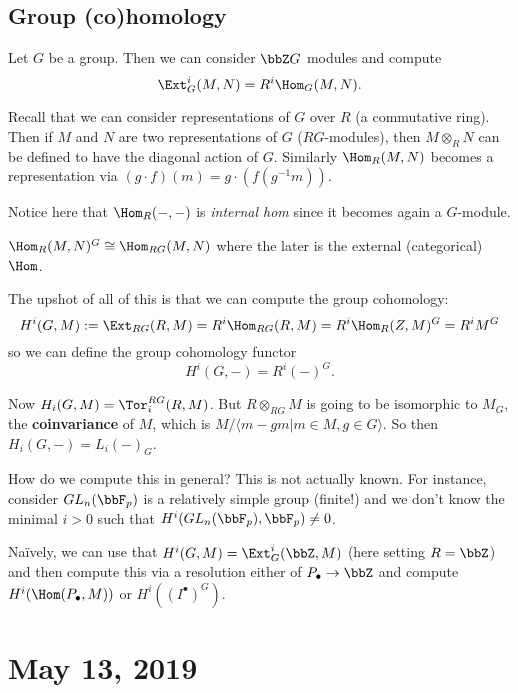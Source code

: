 \documentclass[12pt]{article}
\begin{document}
\subsection{Group (co)homology}
Let $G$ be a group. Then we can consider $\bbZ G$ modules and compute 
\[\Ext_G^i(M,N)=R^i\Hom_G(M,N).\]

Recall that we can consider representations of $G$ over $R$ (a commutative ring). Then if $M$ and $N$ 
are two representations of $G$ ($RG$-modules), then $M\otimes_R N$ can be defined to have the diagonal action of $G$.
Similarly $\Hom_R(M,N)$ becomes a representation via $(g\cdot f)(m)=g\cdot(f(g^{-1}m))$.
\begin{rmk}
	Notice here that $\Hom_R(-,-)$ is \textit{internal hom} since it becomes again a $G$-module.
\end{rmk}
\begin{prop}
	$\Hom_R(M,N)^G\cong \Hom_{RG}(M,N)$ where the later is the external (categorical) $\Hom$.
\end{prop}

The upshot of all of this is that we can compute the group cohomology:
\[H^i(G,M):=\Ext_{RG}(R,M)=R^i\Hom_{RG}(R,M)=R^i\Hom_R(Z,M)^G=R^iM^G\]
so we can define the group cohomology functor 
\[H^i(G,-)=R^i(-)^G.\]

Now $H_i(G,M)=\Tor_i^{RG}(R,M)$. But $R\otimes_{RG}M$ is going to be isomorphic to $M_G$, the \textbf{coinvariance} of $M$,
which is $M/\langle m-gm|m\in M,g\in G\rangle$. So then $H_i(G,-)=L_i(-)_G$.

\begin{rmk}
	How do we compute this in general? This is not actually known. For instance, consider $GL_n(\bbF_p)$ is a relatively simple group (finite!)
	and we don't know the minimal $i>0$ such that $H^i(GL_n(\bbF_p),\bbF_p)\ne 0$.
\end{rmk}

Na\"ively, we can use that $H^i(G,M)=\Ext_G^i(\bbZ,M)$ (here setting $R=\bbZ$) and then compute this via a resolution 
either of $P_\bullet\to\bbZ$ and compute $H^i(\Hom(P_\bullet,M))$ or $H^i((I^\bullet)^G)$.

\section{May 13, 2019}
\end{document}
